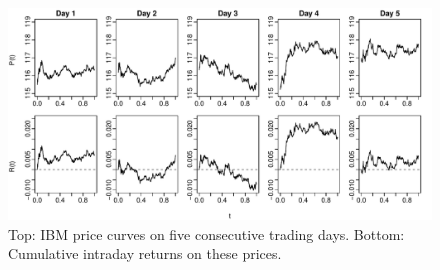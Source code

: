 \documentclass[nojss]{jss}
\begin{document}
\begin{figure}[!hbtp]
\centering
\includegraphics[width=\textwidth]{ibm}
\caption{Top: IBM price curves on five consecutive trading days. Bottom: Cumulative intraday returns on these prices.}\label{f:cidr}
\end{figure}
\end{document}
